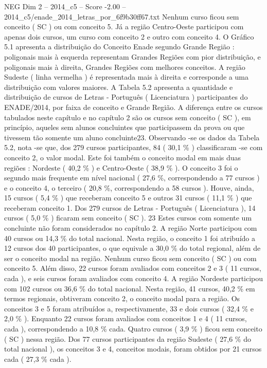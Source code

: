 \begin{textsample}{NEG Dim 2 – 2014\_c5 – Score -2.00 – 2014\_c5/enade\_2014\_letras\_por\_6f9b30ff67.txt}
Nenhum curso ficou sem conceito ( SC ) ou com conceito 5.
Já a região Centro-Oeste participou com apenas dois cursos, um curso com conceito 2 e outro com conceito 4.
O Gráfico 5.1 apresenta a distribuição do Conceito Enade segundo Grande Região : poligonais mais à esquerda representam Grandes Regiões com pior distribuição, e poligonais mais à direita, Grandes Regiões com melhores conceitos.
A região Sudeste ( linha vermelha ) é representada mais à direita e corresponde a uma distribuição com valores maiores.
A Tabela 5.2 apresenta a quantidade e distribuição de cursos de Letras - Português ( Licenciatura ) participantes do ENADE/2014, por faixa de conceito e Grande Região.
A diferença entre os cursos tabulados neste capítulo e no capítulo 2 são os cursos sem conceito ( SC ), em princípio, aqueles sem alunos concluintes que participassem da prova ou que tivessem tão somente um aluno concluinte23.
Observando -se os dados da Tabela 5.2, nota -se que, dos 279 cursos participantes, 84 ( 30,1 \% ) classificaram -se com conceito 2, o valor modal.
Este foi também o conceito modal em mais duas regiões : Nordeste ( 40,2 \% ) e Centro-Oeste ( 38,9 \% ).
O conceito 3 foi o segundo mais frequente em nível nacional ( 27,6 \%, correspondendo a 77 cursos ) e o conceito 4, o terceiro ( 20,8 \%, correspondendo a 58 cursos ).
Houve, ainda, 15 cursos ( 5,4 \% ) que receberam conceito 5 e outros 31 cursos ( 11,1 \% ) que receberam conceito 1.
Dos 279 cursos de Letras - Português ( Licenciatura ), 14 cursos ( 5,0 \% ) ficaram sem conceito ( SC ). 23 Estes cursos com somente um concluinte não foram considerados no capítulo 2.
A região Norte participou com 40 cursos ou 14,3 \% do total nacional.
Nesta região, o conceito 1 foi atribuído a 12 cursos dos 40 participantes, o que equivale a 30,0 \% do total regional, além de ser o conceito modal na região.
Nenhum curso ficou sem conceito ( SC ) ou com conceito 5.
Além disso, 22 cursos foram avaliados com conceitos 2 e 3 ( 11 cursos, cada ), e seis cursos foram avaliados com conceito 4.
A região Nordeste participou com 102 cursos ou 36,6 \% do total nacional.
Nesta região, 41 cursos, 40,2 \% em termos regionais, obtiveram conceito 2, o conceito modal para a região.
Os conceitos 3 e 5 foram atribuídos a, respectivamente, 33 e dois cursos ( 32,4 \% e 2,0 \% ).
Enquanto 22 cursos foram avaliados com conceitos 1 e 4 ( 11 cursos, cada ), correspondendo a 10,8 \% cada.
Quatro cursos ( 3,9 \% ) ficou sem conceito ( SC ) nessa região.
Dos 77 cursos participantes da região Sudeste ( 27,6 \% do total nacional ), os conceitos 3 e 4, conceitos modais, foram obtidos por 21 cursos cada ( 27,3 \% cada ).

\end{textsample}
